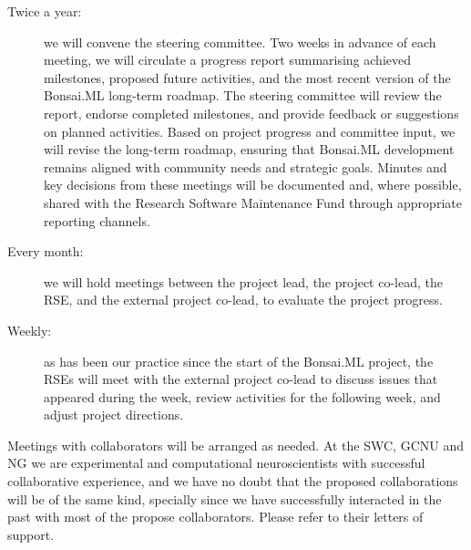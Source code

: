 \begin{description}

    \item[Twice a year:] we will convene the steering committee. Two weeks in
        advance of each meeting, we will circulate a progress report
        summarising achieved milestones, proposed future activities, and the
        most recent version of the Bonsai.ML long-term roadmap.
        The steering committee will review the report, endorse completed
        milestones, and provide feedback or suggestions on planned activities.
        Based on project progress and committee input, we will revise the
        long-term roadmap, ensuring that Bonsai.ML development remains aligned
        with community needs and strategic goals.
        Minutes and key decisions from these meetings will be documented and,
        where possible, shared with the Research Software Maintenance Fund
        through appropriate reporting channels.

    \item[Every month:] we will hold meetings between the project lead, the
        project co-lead, the RSE, and the external project co-lead, to evaluate
        the project progress.

    \item[Weekly:] as has been our practice since the start of the Bonsai.ML
        project, the RSEs will meet with the external project co-lead to
        discuss issues that appeared during the week, review activities for the
        following week, and adjust project directions.

\end{description}

Meetings with collaborators will be arranged as needed.
%
At the SWC, GCNU and NG we are experimental and computational neuroscientists
with successful collaborative experience, and we have no doubt that the
proposed collaborations will be of the same kind,
%
specially since we have successfully interacted in the past with most of the
propose collaborators.
%
Please refer to their letters of support.
